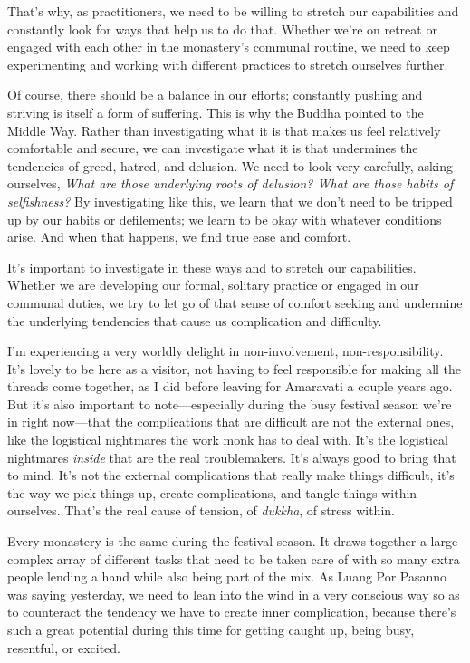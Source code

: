That's why, as practitioners, we need to be willing to stretch our 
capabilities and constantly look for ways that help us to do that. 
Whether we're on retreat or engaged with each other in the monastery's 
communal routine, we need to keep experimenting and working with 
different practices to stretch ourselves further.

Of course, there should be a balance in our efforts; constantly pushing 
and striving is itself a form of suffering. This is why the Buddha 
pointed to the Middle Way. Rather than investigating what it is that 
makes us feel relatively comfortable and secure, we can investigate 
what it is that undermines the tendencies of greed, hatred, and 
delusion. We need to look very carefully, asking ourselves, \emph{What 
are those underlying roots of delusion? What are those habits of 
selfishness?} By investigating like this, we learn that we don't need 
to be tripped up by our habits or defilements; we learn to be okay with 
whatever conditions arise. And when that happens, we find true ease and 
comfort.

It's important to investigate in these ways and to stretch our 
capabilities. Whether we are developing our formal, solitary practice 
or engaged in our communal duties, we try to let go of that sense of 
comfort seeking and undermine the underlying tendencies that cause us 
complication and difficulty.


I'm experiencing a very worldly delight in non-involvement, 
non-responsibility. It's lovely to be here as a visitor, not having to 
feel responsible for making all the threads come together, as I did 
before leaving for Amaravati a couple years ago. But it's also 
important to note---especially during the busy festival season we're in 
right now---that the complications that are difficult are not the 
external ones, like the logistical nightmares the work monk has to deal 
with. It's the logistical nightmares \emph{inside} that are the real 
troublemakers. It's always good to bring that to mind. It's not the 
external complications that really make things difficult, it's the way 
we pick things up, create complications, and tangle things within 
ourselves. That's the real cause of tension, of \emph{dukkha}, of 
stress within.

Every monastery is the same during the festival season. It draws 
together a large complex array of different tasks that need to be taken 
care of with so many extra people lending a hand while also being part 
of the mix. As Luang Por Pasanno was saying yesterday, we need to lean 
into the wind in a very conscious way so as to counteract the tendency 
we have to create inner complication, because there's such a great 
potential during this time for getting caught up, being busy, 
resentful, or excited.


